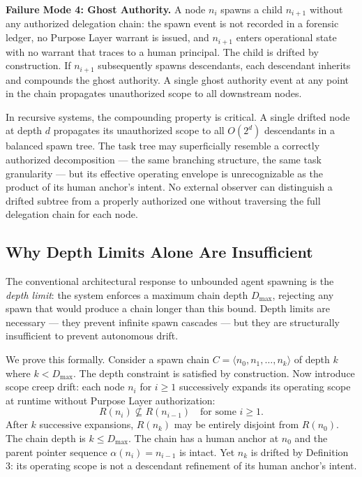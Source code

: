 \medskip
\noindent\textbf{Failure Mode 4: Ghost Authority.}  A node $n_i$ spawns a child $n_{i+1}$ without any authorized delegation chain: the spawn event is not recorded in a forensic ledger, no Purpose Layer warrant is issued, and $n_{i+1}$ enters operational state with no warrant that traces to a human principal.  The child is drifted by construction.  If $n_{i+1}$ subsequently spawns descendants, each descendant inherits and compounds the ghost authority.  A single ghost authority event at any point in the chain propagates unauthorized scope to all downstream nodes.

In recursive systems, the compounding property is critical.  A single drifted node at depth $d$ propagates its unauthorized scope to all $O(2^d)$ descendants in a balanced spawn tree.  The task tree may superficially resemble a correctly authorized decomposition — the same branching structure, the same task granularity — but its effective operating envelope is unrecognizable as the product of its human anchor's intent.  No external observer can distinguish a drifted subtree from a properly authorized one without traversing the full delegation chain for each node.

\subsection{Why Depth Limits Alone Are Insufficient}

The conventional architectural response to unbounded agent spawning is the \emph{depth limit}: the system enforces a maximum chain depth $D_{\max}$, rejecting any spawn that would produce a chain longer than this bound.  Depth limits are necessary — they prevent infinite spawn cascades — but they are structurally insufficient to prevent autonomous drift.

We prove this formally.  Consider a spawn chain $C = \langle n_0, n_1, \ldots, n_k \rangle$ of depth $k$ where $k < D_{\max}$.  The depth constraint is satisfied by construction.  Now introduce scope creep drift: each node $n_i$ for $i \geq 1$ successively expands its operating scope at runtime without Purpose Layer authorization:
\[
R(n_i) \not\subseteq R(n_{i-1}) \quad \text{for some } i \geq 1.
\tag{6}
\]
After $k$ successive expansions, $R(n_k)$ may be entirely disjoint from $R(n_0)$.  The chain depth is $k \leq D_{\max}$.  The chain has a human anchor at $n_0$ and the parent pointer sequence $\alpha(n_i) = n_{i-1}$ is intact.  Yet $n_k$ is drifted by Definition 3: its operating scope is not a descendant refinement of its human anchor's intent.

